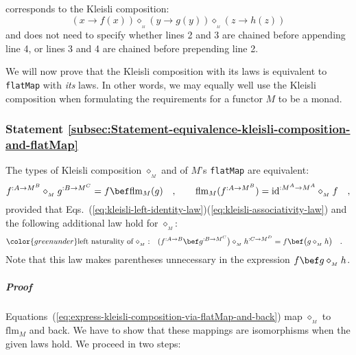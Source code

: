 \noindent corresponds to the Kleisli composition:\vspace{-0.2\baselineskip}
\[
(x\rightarrow f(x))\diamond_{_{_{M}}}(y\rightarrow g(y))\diamond_{_{_{M}}}(z\rightarrow h(z))
\]
and does not need to specify whether lines 2 and 3 are chained before
appending line 4, or lines 3 and 4 are chained before prepending line
2.

We will now prove that the Kleisli composition with its laws is equivalent
to \lstinline!flatMap! with \emph{its} laws. In other words, we may
equally well use the Kleisli composition when formulating the requirements
for a functor $M$ to be a monad.

\subsubsection{Statement \label{subsec:Statement-equivalence-kleisli-composition-and-flatMap}\ref{subsec:Statement-equivalence-kleisli-composition-and-flatMap}}

The types of Kleisli composition $\diamond_{_{M}}$ and of $M$\textsf{'}s
\lstinline!flatMap! are equivalent:
\begin{equation}
f^{:A\rightarrow M^{B}}\diamond_{_{M}}g^{:B\rightarrow M^{C}}=f\bef\text{flm}_{M}(g)\quad,\quad\quad\text{flm}_{M}(f^{:A\rightarrow M^{B}})=\text{id}^{:M^{A}\rightarrow M^{A}}\diamond_{_{M}}f\quad,\label{eq:express-kleisli-composition-via-flatMap-and-back}
\end{equation}
provided that Eqs.~(\ref{eq:kleisli-left-identity-law})\textendash (\ref{eq:kleisli-associativity-law})
and the following additional law hold for $\diamond_{_{M}}$:
\begin{align}
{\color{greenunder}\text{left naturality of }\diamond_{_{M}}:}\quad & (f^{:A\rightarrow B}\bef g^{:B\rightarrow M^{C}}\big)\diamond_{_{M}}h^{:C\rightarrow M^{D}}=f\bef\big(g\diamond_{_{M}}h\big)\quad.\label{eq:left-naturality-of-kleisli-composition}
\end{align}
Note that this law makes parentheses unnecessary in the expression
$f\bef g\diamond_{_{M}}h$.

\subparagraph{Proof}

Equations~(\ref{eq:express-kleisli-composition-via-flatMap-and-back})
map $\diamond_{_{M}}$ to $\text{flm}_{M}$ and back. We have to show
that these mappings are isomorphisms when the given laws hold. We
proceed in two steps:

